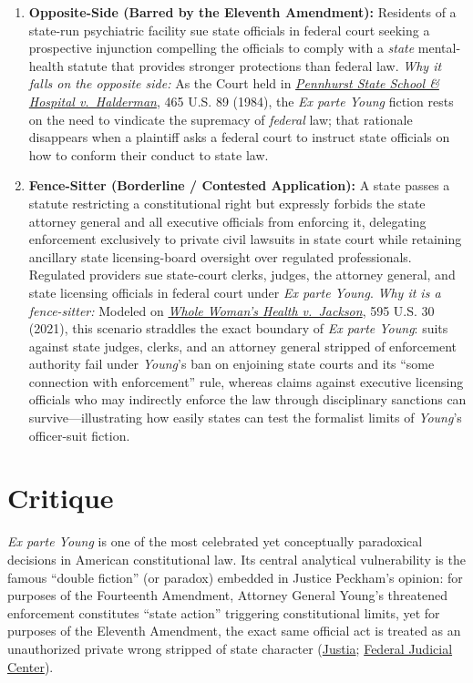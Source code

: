 \documentclass[12pt]{article}
\begin{document}
\begin{enumerate}
\item \textbf{Opposite-Side (Barred by the Eleventh Amendment):} Residents of a state-run psychiatric facility sue state officials in federal court seeking a prospective injunction compelling the officials to comply with a \emph{state} mental-health statute that provides stronger protections than federal law. \textit{Why it falls on the opposite side:} As the Court held in \href{https://www.law.cornell.edu/supremecourt/text/465/89}{\textit{Pennhurst State School \& Hospital v.\ Halderman}}, 465 U.S. 89 (1984), the \textit{Ex parte Young} fiction rests on the need to vindicate the supremacy of \emph{federal} law; that rationale disappears when a plaintiff asks a federal court to instruct state officials on how to conform their conduct to state law.

\item \textbf{Fence-Sitter (Borderline / Contested Application):} A state passes a statute restricting a constitutional right but expressly forbids the state attorney general and all executive officials from enforcing it, delegating enforcement exclusively to private civil lawsuits in state court while retaining ancillary state licensing-board oversight over regulated professionals. Regulated providers sue state-court clerks, judges, the attorney general, and state licensing officials in federal court under \textit{Ex parte Young}. \textit{Why it is a fence-sitter:} Modeled on \href{https://supreme.justia.com/cases/federal/us/595/21-463/}{\textit{Whole Woman's Health v.\ Jackson}}, 595 U.S. 30 (2021), this scenario straddles the exact boundary of \textit{Ex parte Young}: suits against state judges, clerks, and an attorney general stripped of enforcement authority fail under \textit{Young}'s ban on enjoining state courts and its ``some connection with enforcement'' rule, whereas claims against executive licensing officials who may indirectly enforce the law through disciplinary sanctions can survive---illustrating how easily states can test the formalist limits of \textit{Young}'s officer-suit fiction.
\end{enumerate}

\section{Critique}

\textit{Ex parte Young} is one of the most celebrated yet conceptually paradoxical decisions in American constitutional law. Its central analytical vulnerability is the famous ``double fiction'' (or paradox) embedded in Justice Peckham's opinion: for purposes of the Fourteenth Amendment, Attorney General Young's threatened enforcement constitutes ``state action'' triggering constitutional limits, yet for purposes of the Eleventh Amendment, the exact same official act is treated as an unauthorized private wrong stripped of state character (\href{https://supreme.justia.com/cases/federal/us/209/123/}{Justia}; \href{https://www.fjc.gov/history/cases/cases-that-shaped-the-federal-courts/ex-parte-young}{Federal Judicial Center}).
\end{document}
